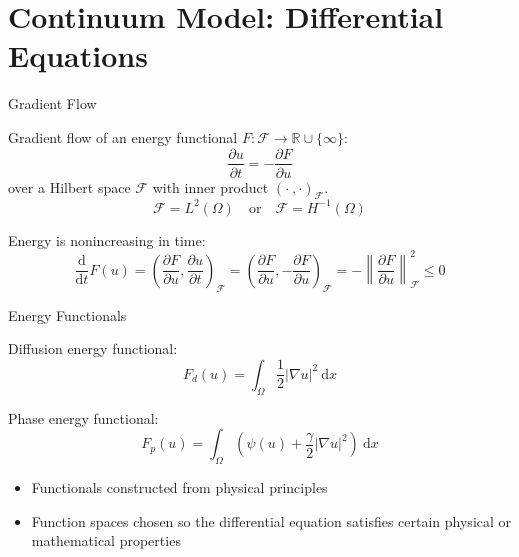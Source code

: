 \documentclass[professionalfont]{beamer}
\theoremstyle{remark}
\newcommand{\ud}{\mathrm{d}}
\begin{document}
\section{Continuum Model: Differential Equations}

\begin{frame}{Gradient Flow}

	Gradient flow of an energy functional $F\colon\mathcal{F}\to\mathbb{R}\cup\{\infty\}$: 
	\begin{equation}
		\frac{\partial u}{\partial t}=-\frac{\partial F}{\partial u}
	\end{equation}
	over a Hilbert space $\mathcal{F}$ with inner product $(\cdot ~, \cdot)_{\mathcal{F}}$.
	\begin{equation*}
		\mathcal{F}=L^2(\Omega)\quad\text{or}\quad\mathcal{F}=H^{-1}(\Omega)
	\end{equation*}
	
	\vspace*{10 pt}
	Energy is nonincreasing in time: 
	\begin{equation*}
		\frac{\ud}{\ud t}F(u)=(\frac{\partial F}{\partial u},\frac{\partial u}{\partial t})_{\mathcal{F}}=(\frac{\partial F}{\partial u},-\frac{\partial F}{\partial u})_{\mathcal{F}}=-\left\|\frac{\partial F}{\partial u}\right\|_{\mathcal{F}}^2\le0
	\end{equation*}

\end{frame}	

	
\begin{frame}{Energy Functionals} 
	
	Diffusion energy functional:
	\begin{equation}
		F_d(u)=\int_\Omega\frac{1}{2}|\nabla u|^2~\ud x
	\end{equation}
	
	Phase energy functional:
	\begin{equation} \label{eq_func}
		F_p(u)=\int_\Omega \left(\psi(u)+\frac{\gamma}{2}|\nabla u|^2\right)~\ud x
	\end{equation}

	\begin{itemize}
		\item Functionals constructed from physical principles
		\item Function spaces chosen so the differential equation satisfies certain physical or mathematical properties
	\end{itemize}
	
\end{frame}
\end{document}
